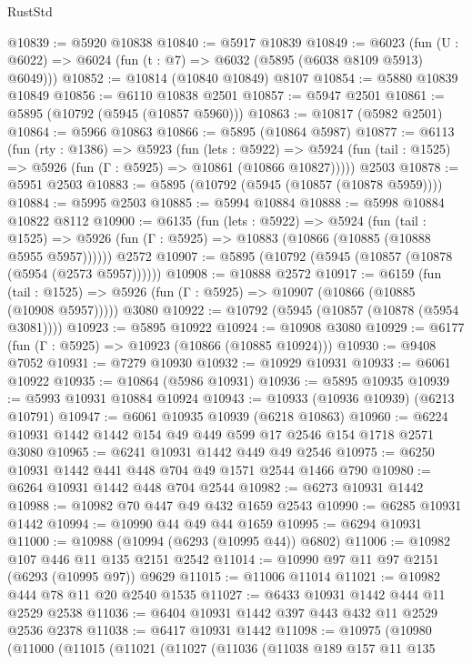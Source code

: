 \begin{lexlean}{RustStd}
\begin{coremodule}
{{@10839 := @5920 @10838
@10840 := @5917 @10839
@10849 := @6023 (fun (U : @6022) => @6024 (fun (t : @7) => @6032 (@5895 (@6038 @8109 @5913) @6049)))
@10852 := @10814 (@10840 @10849) @8107
@10854 := @5880 @10839 @10849
@10856 := @6110 @10838 @2501
@10857 := @5947 @2501
@10861 := @5895 (@10792 (@5945 (@10857 @5960)))
@10863 := @10817 (@5982 @2501)
@10864 := @5966 @10863
@10866 := @5895 (@10864 @5987)
@10877 := @6113
    (fun (rty : @1386) =>
    @5923
      (fun (lets : @5922) =>
      @5924 (fun (tail : @1525) => @5926 (fun (Γ : @5925) => @10861 (@10866 @10827)))))
    @2503
@10878 := @5951 @2503
@10883 := @5895 (@10792 (@5945 (@10857 (@10878 @5959))))
@10884 := @5995 @2503
@10885 := @5994 @10884
@10888 := @5998 @10884 @10822 @8112
@10900 := @6135
    (fun (lets : @5922) =>
    @5924
      (fun (tail : @1525) =>
      @5926 (fun (Γ : @5925) => @10883 (@10866 (@10885 (@10888 @5955 @5957))))))
    @2572
@10907 := @5895 (@10792 (@5945 (@10857 (@10878 (@5954 (@2573 @5957))))))
@10908 := @10888 @2572
@10917 := @6159
    (fun (tail : @1525) => @5926 (fun (Γ : @5925) => @10907 (@10866 (@10885 (@10908 @5957)))))
    @3080
@10922 := @10792 (@5945 (@10857 (@10878 (@5954 @3081))))
@10923 := @5895 @10922
@10924 := @10908 @3080
@10929 := @6177 (fun (Γ : @5925) => @10923 (@10866 (@10885 @10924)))
@10930 := @9408 @7052
@10931 := @7279 @10930
@10932 := @10929 @10931
@10933 := @6061 @10922
@10935 := @10864 (@5986 @10931)
@10936 := @5895 @10935
@10939 := @5993 @10931 @10884 @10924
@10943 := @10933 (@10936 @10939) (@6213 @10791)
@10947 := @6061 @10935 @10939 (@6218 @10863)
@10960 := @6224 @10931 @1442 @1442 @154 @49 @449 @599 @17 @2546 @154 @1718 @2571 @3080
@10965 := @6241 @10931 @1442 @449 @49 @2546
@10975 := @6250 @10931 @1442 @441 @448 @704 @49 @1571 @2544 @1466 @790
@10980 := @6264 @10931 @1442 @448 @704 @2544
@10982 := @6273 @10931 @1442
@10988 := @10982 @70 @447 @49 @432 @1659 @2543
@10990 := @6285 @10931 @1442
@10994 := @10990 @44 @49 @44 @1659
@10995 := @6294 @10931
@11000 := @10988 (@10994 (@6293 (@10995 @44)) @6802)
@11006 := @10982 @107 @446 @11 @135 @2151 @2542
@11014 := @10990 @97 @11 @97 @2151 (@6293 (@10995 @97)) @9629
@11015 := @11006 @11014
@11021 := @10982 @444 @78 @11 @20 @2540 @1535
@11027 := @6433 @10931 @1442 @444 @11 @2529 @2538
@11036 := @6404 @10931 @1442 @397 @443 @432 @11 @2529 @2536 @2378
@11038 := @6417 @10931 @1442
@11098 := @10975
    (@10980
      (@11000
        (@11015
          (@11021
            (@11027
              (@11036
                (@11038
                  @189
                  @157
                  @11
                  @135
}}
\end{coremodule}
\end{lexlean}
